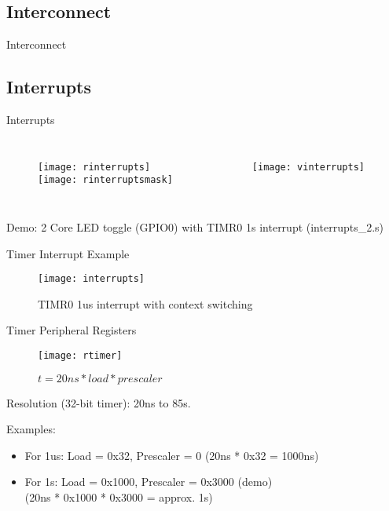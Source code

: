 \documentclass[aspectratio=169]{beamer}
\begin{document}
\subsection{Interconnect}
\begin{frame}{Interconnect}

\end{frame}

\subsection{Interrupts}
\begin{frame}[t]{Interrupts}
\begin{columns}[t]
\begin{figure}
\texttt{[image: rinterrupts]}\\
\vspace{.5cm}
\texttt{[image: rinterruptsmask]}
\end{figure}
\begin{figure}
\texttt{[image: vinterrupts]}
\end{figure}
\end{columns}
\vspace{1cm}
Demo: 2 Core LED toggle (GPIO0) with TIMR0 1s interrupt (interrupts\_2.s)
\end{frame}

\begin{frame}{Timer Interrupt Example}
    \begin{figure}
        \centering
        \texttt{[image: interrupts]}
        \caption{TIMR0 1us interrupt with context switching}
        \label{fig:my_label}
    \end{figure}
\end{frame}

\begin{frame}{Timer Peripheral Registers}
    \begin{figure}
        \centering
        \texttt{[image: rtimer]}
        \caption{$t = 20{ns} * {load} * {prescaler}$}
        \label{fig:my_label}
    \end{figure}
    Resolution (32-bit timer): 20ns to 85s.
    
    Examples: 
    \begin{itemize}
        \item For 1us: Load = 0x32, Prescaler = 0 (20ns * 0x32 = 1000ns)
        \item For 1s:  Load = 0x1000, Prescaler = 0x3000 (demo)\\(20ns * 0x1000 * 0x3000 = approx. 1s)
    \end{itemize}
\end{frame}
\end{document}

